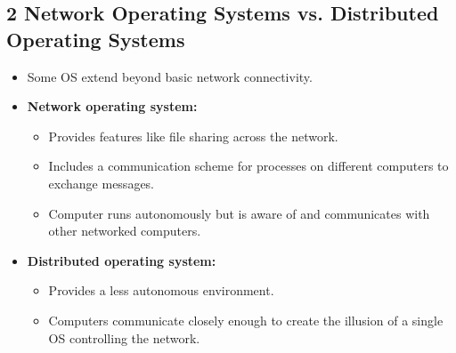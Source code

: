 \documentclass{article}
\begin{document}
\subsection*{2 Network Operating Systems vs. Distributed Operating Systems}
\begin{itemize}
    \item Some OS extend beyond basic network connectivity.
    \item \textbf{Network operating system:}
    \begin{itemize}
        \item Provides features like file sharing across the network.
        \item Includes a communication scheme for processes on different computers to exchange messages.
        \item Computer runs autonomously but is aware of and communicates with other networked computers.
    \end{itemize}
    \item \textbf{Distributed operating system:}
    \begin{itemize}
        \item Provides a less autonomous environment.
        \item Computers communicate closely enough to create the illusion of a single OS controlling the network.
    \end{itemize}
\end{itemize}
\end{document}
